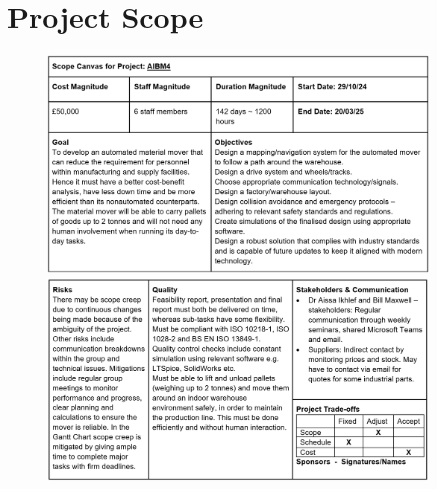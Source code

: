 \documentclass[12pt]{article}
\begin{document}
\section{Project Scope}
\begin{figure}[htbp]
    \centering
     \includegraphics[width=0.9\textwidth]{Scope Canvas 1.png}
     \includegraphics[width=0.9\textwidth]{Scope Canvas 2.png}
\end{figure}
\end{document}
